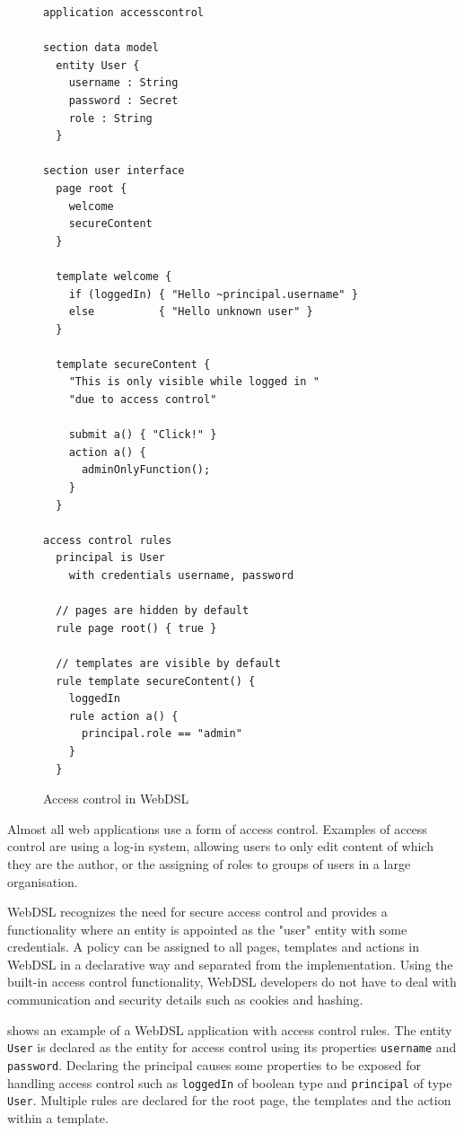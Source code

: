     \begin{figure}
      \capstart
      \begin{verbatim}
application accesscontrol

section data model
  entity User {
    username : String
    password : Secret
    role : String
  }

section user interface
  page root {
    welcome
    secureContent
  }

  template welcome {
    if (loggedIn) { "Hello ~principal.username" }
    else          { "Hello unknown user" }
  }

  template secureContent {
    "This is only visible while logged in "
    "due to access control"

    submit a() { "Click!" }
    action a() {
      adminOnlyFunction();
    }
  }

access control rules
  principal is User 
    with credentials username, password

  // pages are hidden by default
  rule page root() { true }

  // templates are visible by default
  rule template secureContent() {
    loggedIn
    rule action a() {
      principal.role == "admin"
    }
  }
      \end{verbatim}
      \caption{\label{fig:webdsl-access-control}Access control in WebDSL}
    \end{figure}

    Almost all web applications use a form of access control. Examples of access control are using a log-in system, allowing users to only edit content of which they are the author, or the assigning of roles to groups of users in a large organisation.

    WebDSL recognizes the need for secure access control and provides a functionality where an entity is appointed as the "user" entity with some credentials. A policy can be assigned to all pages, templates and actions in WebDSL in a declarative way and separated from the implementation. Using the built-in access control functionality, WebDSL developers do not have to deal with communication and security details such as cookies and hashing.

     shows an example of a WebDSL application with access control rules. The entity \texttt{User} is declared as the entity for access control using its properties \texttt{username} and \texttt{password}. Declaring the principal causes some properties to be exposed for handling access control such as \texttt{loggedIn} of boolean type and \texttt{principal} of type \texttt{User}. Multiple rules are declared for the root page, the templates and the action within a template.

